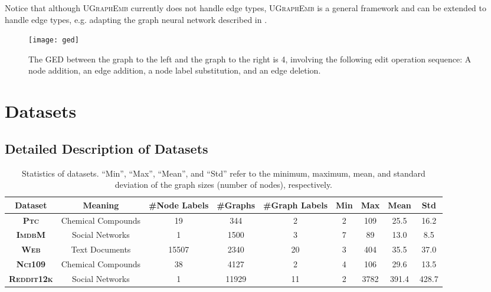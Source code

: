 \documentclass{article}
\newcommand{\model}{\textsc{UGraphEmb}\xspace}
\newcommand{\ptc}{\textsc{Ptc}\xspace}
\newcommand{\imdb}{\textsc{ImdbM}\xspace}
\newcommand{\web}{\textsc{Web}\xspace}
\newcommand{\nci}{\textsc{Nci109}\xspace}
\newcommand{\reddit}{\textsc{Reddit12k}\xspace}
\begin{document}
Notice that although \model currently does not handle edge types, \model is a general framework and can be extended to handle edge types, e.g. adapting the graph neural network described in \cite{kipf2018neural}.


\begin{figure}[h]
\centering
\texttt{[image: ged]}
\caption{The GED between the graph to the left and the graph to the right is 4, involving the following edit operation sequence: A node addition, an edge addition, a node label substitution, and an edge deletion.}
\label{fig:ged}
\vspace*{-2mm}
\end{figure}









%
 \section{Datasets}
\label{sec-data}

\subsection{Detailed Description of Datasets}

\begin{table*}
\begin{tabular}
{ccccccccc} \hline
\textbf{Dataset} & \textbf{Meaning} & \textbf{\#Node Labels} & \textbf{\#Graphs} & \textbf{\#Graph Labels} & \textbf{Min} & \textbf{Max} & \textbf{Mean} & \textbf{Std}\\ \hline
\textbf{\ptc} & Chemical Compounds & 19 & 344 & 2 & 2 & 109 & 25.5 & 16.2 \\
\textbf{\imdb} & Social Networks & 1 & 1500 & 3 & 7 & 89 & 13.0 & 8.5 \\
\textbf{\web} & Text Documents & 15507 & 2340 & 20 & 3 & 404 & 35.5 & 37.0 \\
\textbf{\nci} & Chemical Compounds & 38 & 4127 & 2 & 4 & 106 & 29.6 & 13.5 \\
\textbf{\reddit} & Social Networks & 1 & 11929 & 11 & 2 & 3782 & 391.4 & 428.7 \\
\hline
\end{tabular}
\centering
\caption{Statistics of datasets. ``Min'', ``Max'', ``Mean'', and ``Std'' refer to the minimum, maximum, mean, and standard deviation of the graph sizes (number of nodes), respectively.}
\label{table:dataset_summary}
\end{table*}
\end{document}
